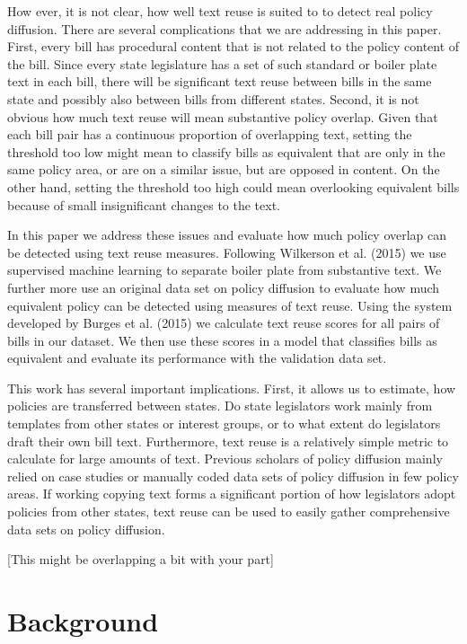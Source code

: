 \documentclass[12pt]{article} %
\begin{document}
How ever, it is not clear, how well text reuse is suited to to detect real
policy diffusion. There are several complications that we are addressing in this
paper. First, every bill has procedural content that is not related to the
policy content of the bill. Since every state legislature has a set of such
standard or boiler plate text in each bill, there will be significant text reuse
between bills in the same state and possibly also between bills from different
states. Second, it is not obvious how much text reuse will mean substantive
policy overlap. Given that each bill pair has a continuous proportion of
overlapping text, setting the threshold too low might mean to classify bills as
equivalent that are only in the same policy area, or are on a similar issue, but
are opposed in content. On the other hand, setting the threshold too high could
mean overlooking equivalent bills because of small insignificant changes to the
text. 

In this paper we address these issues and evaluate how much policy overlap can
be detected using text reuse measures. Following Wilkerson et al. (2015) we use
supervised machine learning to separate boiler plate from substantive text. We
further more use an original data set on policy diffusion to evaluate how much
equivalent policy can be detected using measures of text reuse. Using the system
developed by Burges et al. (2015) we calculate text reuse scores for all pairs
of bills in our dataset. We then use these scores in a model that classifies
bills as equivalent and evaluate its performance with the validation data set. 

This work has several important implications. First, it allows us to estimate,
how policies are transferred between states. Do state legislators work mainly
from templates from other states or interest groups, or to what extent do
legislators draft their own bill text. Furthermore, text reuse is a relatively
simple metric to calculate for large amounts of text. Previous scholars of
policy diffusion mainly relied on case studies or manually coded data sets of
policy diffusion in few policy areas. If working copying text forms a
significant portion of how legislators adopt policies from other states, text
reuse can be used to easily gather comprehensive data sets on policy diffusion. 

[This might be overlapping a bit with your part]

\section{Background}
\end{document}
